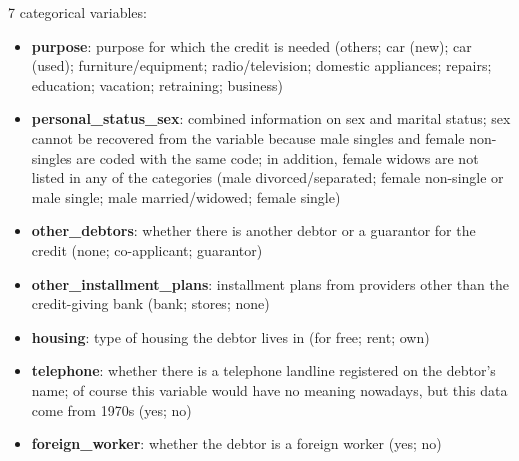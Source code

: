 \documentclass[letterpaper]{article}
\begin{document}
	7 categorical variables:
	\begin{itemize}
		\item \textbf{purpose}:  purpose for which the credit is needed (others; car (new); car (used); furniture/equipment; radio/television; domestic appliances; repairs; education; vacation; retraining; business)
		\item \textbf{personal\_status\_sex}:  combined information on sex and marital status; sex cannot be recovered from the variable because male singles and female non-singles are coded with the same code; in addition, female widows are not listed in any of the categories (male divorced/separated; female non-single or male single; male married/widowed; female single)
		\item \textbf{other\_debtors}: whether there is another debtor or a guarantor for the credit (none; co-applicant; guarantor)
		\item \textbf{other\_installment\_plans}: installment plans from providers other than the credit-giving bank (bank; stores; none)
		\item \textbf{housing}:  type of housing the debtor lives in (for free; rent; own)
		\item \textbf{telephone}:  whether there is a telephone landline registered on the debtor’s name; of course this variable would have no meaning nowadays, but this data come from 1970s (yes; no)
		\item \textbf{foreign\_worker}: whether the debtor is a foreign worker (yes; no)
	\end{itemize}	
\end{document}
